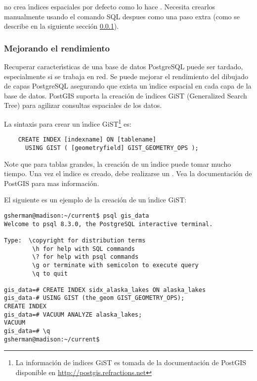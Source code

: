  no crea \'{\i}ndices espaciales por defecto como lo hace . Necesita crearlos manualmente usando el comando SQL  despues como una paso extra (como se describe en la siguiente secci\'on \ref{label_improve}).

\subsubsection{Mejorando el rendimiento} \label{label_improve}

Recuperar caracter\'{\i}sticas de una base de datos PostgreSQL puede ser tardado, especialmente si se trabaja en red. Se puede mejorar el rendimiento del dibujado de capas PostgreSQL asegurando que exista un \'{\i}ndice espacial  en cada capa de la base de datos. PostGIS suporta la creaci\'on de \'{\i}ndices GiST (Generalized Search Tree)  para agilizar consultas espaciales de los datos.

La sintaxis para crear un \'{\i}ndice GiST\footnote{La informaci\'on de \'{\i}ndices GiST es tomada de la documentaci\'on de PostGIS
disponible en \url{http://postgis.refractions.net}}
es:

\begin{verbatim}
    CREATE INDEX [indexname] ON [tablename] 
      USING GIST ( [geometryfield] GIST_GEOMETRY_OPS );
\end{verbatim}

Note que para tablas grandes, la creaci\'on de un \'{\i}ndice puede tomar mucho tiempo. Una vez
el \'{\i}ndice es creado, debe realizarse un . Vea la documentaci\'on de
PostGIS \cite{PostGISweb} para mas informaci\'on.

El siguiente es un ejemplo de la creaci\'on de un \'{\i}ndice GiST:
\begin{verbatim}
gsherman@madison:~/current$ psql gis_data
Welcome to psql 8.3.0, the PostgreSQL interactive terminal.

Type:  \copyright for distribution terms
        \h for help with SQL commands
        \? for help with psql commands
        \g or terminate with semicolon to execute query
        \q to quit

gis_data=# CREATE INDEX sidx_alaska_lakes ON alaska_lakes
gis_data-# USING GIST (the_geom GIST_GEOMETRY_OPS);
CREATE INDEX
gis_data=# VACUUM ANALYZE alaska_lakes;
VACUUM
gis_data=# \q
gsherman@madison:~/current$
\end{verbatim}

